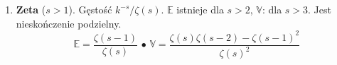 \documentclass[a4paper, landscape]{extarticle}
\newcommand{\expected}{\mathbb{E}}
\newcommand{\variance}{\mathbb{V}}
\newenvironment{enumx}{\begin{enumerate} \setlength{\itemsep}{0pt} \setlength{\parskip}{0pt} \setlength{\parsep}{0pt}}{\end{enumerate}}
\begin{document}
\begin{multicols*}{3}
\begin{enumx}
\item \textbf{Zeta} ($s > 1$).
	Gęstość $k^{-s} / \zeta(s)$.
	$\expected$ istnieje dla $s > 2$, $\variance$: dla $s >3$.
	Jest nieskończenie podzielny.
	\[
		\expected = \frac{\zeta(s-1)}{\zeta(s)} \,\bullet\,
		\variance = \frac{\zeta(s)\zeta(s-2) - \zeta(s-1)^2}{\zeta(s)^2}
	\]
\end{enumx}

\end{multicols*}
\end{document}
